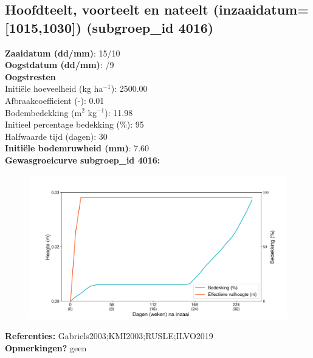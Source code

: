 \documentclass{article}
\begin{document}
 \subsection{Hoofdteelt, voorteelt en nateelt (inzaaidatum=[1015,1030]) (subgroep\_id 4016)} 
  \textbf{Zaaidatum (dd/mm)}: 15/10  \vspace{0.10cm} \\ 
  \textbf{Oogstdatum (dd/mm)}: /9  \vspace{0.10cm} \\ 
  \textbf{Oogstresten} \vspace{0.05cm} \\ 
  \tab Initi\"{e}le hoeveelheid (kg ha$^{-1}$): 2500.00 \vspace{0.05cm} \\ 
  \tab Afbraakcoefficient (-): 0.01 \vspace{0.05cm} \\ 
  \tab Bodembedekking (m$^2$ kg$^{-1}$): 11.98 \vspace{0.05cm} \\ 
  \tab Initieel percentage bedekking (\%): 95 \vspace{0.05cm} \\ 
  \tab Halfwaarde tijd (dagen): 30 \vspace{0.05cm} \\ 
  \textbf{Initi\"{e}le bodemruwheid (mm)}: 7.60 \vspace{0.05cm} \\ 
  \textbf{Gewasgroeicurve subgroep\_id 4016:} 
 \begin{center} \begin{figure}[H] \includegraphics[width=12.5cm]{temp/4016.png} \end{figure} \end{center} 
  \textbf{Referenties:} Gabriels2003;KMI2003;RUSLE;ILVO2019 \vspace{0.10cm} \\ 
  \textbf{Opmerkingen?} geen \vspace{0.10cm} \\ 
 \newpage 
\end{document}
